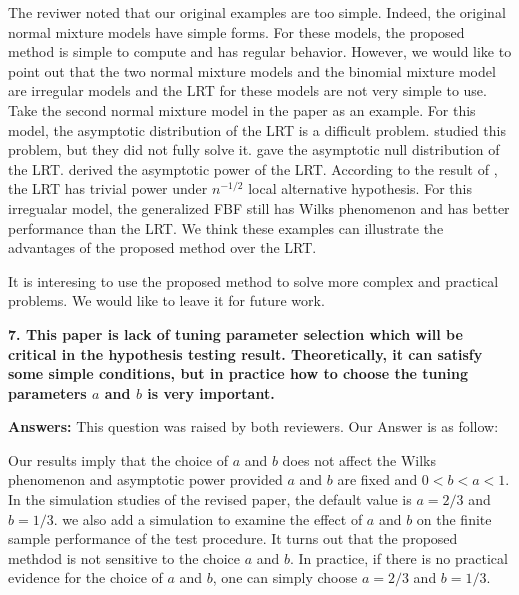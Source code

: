 \documentclass[11pt]{article}
\theoremstyle{plain}
\theoremstyle{definition}
\theoremstyle{remark}
\begin{document}
The reviwer noted that our original examples are too simple.
Indeed, the original normal mixture models have simple forms.
For these models, the proposed method is simple to compute and has regular behavior.
However, we would like to point out that the two normal mixture models and the binomial mixture model are irregular models and the LRT for these models are not very simple to use.
Take the second normal mixture model in the paper as an example.
For this model, the asymptotic distribution of the LRT is a difficult problem.
\cite{bickel1993} studied this problem, but they did not fully solve it.
\cite{LIU200461} gave the asymptotic null distribution of the LRT.
\cite{HALL2005158} derived the asymptotic power of the LRT.
According to the result of \cite{HALL2005158}, the LRT has trivial power under $n^{-1/2}$ local alternative hypothesis.
For this irregualar model, the generalized FBF still has Wilks phenomenon and has better performance than the LRT.
We think these examples can illustrate the advantages of the proposed method over the LRT.

It is interesing to use the proposed method to solve more complex and practical problems.
We would like to leave it for future work.

\textbf{
    7. This paper is lack of tuning parameter selection which will be critical in the hypothesis testing result.
    Theoretically, it can satisfy some simple conditions, but in practice how to choose the tuning parameters $a$ and $b$ is very important.
}

\textbf{Answers:}
This question was raised by both reviewers.
Our Answer is as follow:

Our results imply that the choice of $a$ and $b$ does not affect the Wilks phenomenon and asymptotic power provided $a$ and $b$ are fixed and $0<b<a<1$.
In the simulation studies of the revised paper, the default value is $a=2/3$ and $b= 1/3$.
we also add a simulation to examine the effect of $a$ and $b$ on the finite sample performance of the test procedure.
It turns out that the proposed methdod is not sensitive to the choice $a$ and $b$.
In practice, if there is no practical evidence for the choice of $a$ and $b$, one can simply choose $a = 2/3$ and $b = 1/3$.
\end{document}
